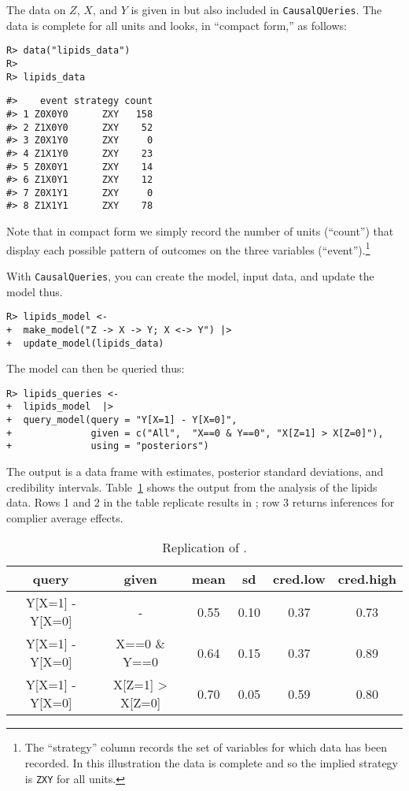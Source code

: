 \documentclass[
  11pt,
  article]{jss}
\begin{document}
The data on \(Z\), \(X\), and \(Y\) is given in
\citet{chickering_clinicians_1996} but also included in
\texttt{CausalQUeries}. The data is complete for all units and looks, in
``compact form,'' as follows:

\begin{verbatim}
R> data("lipids_data")
R> 
R> lipids_data
\end{verbatim}

\begin{verbatim}
#>    event strategy count
#> 1 Z0X0Y0      ZXY   158
#> 2 Z1X0Y0      ZXY    52
#> 3 Z0X1Y0      ZXY     0
#> 4 Z1X1Y0      ZXY    23
#> 5 Z0X0Y1      ZXY    14
#> 6 Z1X0Y1      ZXY    12
#> 7 Z0X1Y1      ZXY     0
#> 8 Z1X1Y1      ZXY    78
\end{verbatim}

Note that in compact form we simply record the number of units
(``count'') that display each possible pattern of outcomes on the three
variables (``event'').\footnote{The ``strategy'' column records the set
  of variables for which data has been recorded. In this illustration
  the data is complete and so the implied strategy is \texttt{ZXY} for
  all units.}

With \texttt{CausalQueries}, you can create the model, input data, and
update the model thus.

\begin{verbatim}
R> lipids_model <-  
+  make_model("Z -> X -> Y; X <-> Y") |>
+  update_model(lipids_data)
\end{verbatim}

The model can then be queried thus:

\begin{verbatim}
R> lipids_queries <- 
+  lipids_model  |>
+  query_model(query = "Y[X=1] - Y[X=0]",
+              given = c("All",  "X==0 & Y==0", "X[Z=1] > X[Z=0]"),
+              using = "posteriors") 
\end{verbatim}

The output is a data frame with estimates, posterior standard
deviations, and credibility intervals. Table~\ref{tbl-lipids} shows the
output from the analysis of the lipids data. Rows 1 and 2 in the table
replicate results in \citet{chickering_clinicians_1996}; row 3 returns
inferences for complier average effects.

\hypertarget{tbl-lipids}{}
\begin{longtable}[t]{cccccc}
\caption{\label{tbl-lipids}Replication of \citet{chickering_clinicians_1996}. }\tabularnewline

\toprule
query & given & mean & sd & cred.low & cred.high\\
\midrule
Y[X=1] - Y[X=0] & - & 0.55 & 0.10 & 0.37 & 0.73\\
Y[X=1] - Y[X=0] & X==0 \& Y==0 & 0.64 & 0.15 & 0.37 & 0.89\\
Y[X=1] - Y[X=0] & X[Z=1] > X[Z=0] & 0.70 & 0.05 & 0.59 & 0.80\\
\bottomrule
\end{longtable}
\end{document}
